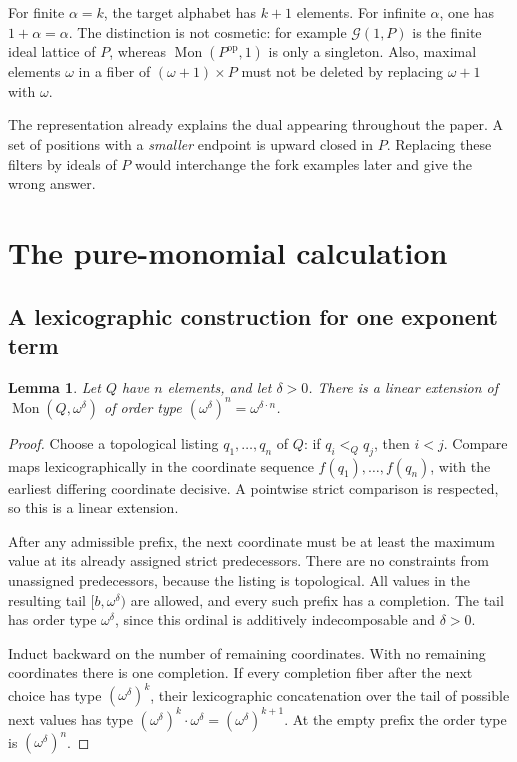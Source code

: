 \documentclass[11pt,a4paper]{article}
\newtheorem{lemma}[lemma]{Lemma}
\theoremstyle{definition}
\theoremstyle{remark}
\newcommand{\Mon}{\operatorname{Mon}}
\newcommand{\Grid}{\mathcal{G}}
\newcommand{\op}{\mathrm{op}}
\begin{document}
For finite $\alpha=k$, the target alphabet has $k+1$ elements. For infinite
$\alpha$, one has $1+\alpha=\alpha$. The distinction is not cosmetic:
for example $\Grid(1,P)$ is the finite ideal lattice of $P$, whereas
$\Mon(P^{\op},1)$ is only a singleton. Also, maximal elements $\omega$
in a fiber of $(\omega+1)\times P$ must not be deleted by replacing
$\omega+1$ with $\omega$.

The representation already explains the dual appearing throughout the
paper. A set of positions with a \emph{smaller} endpoint is upward closed
in $P$. Replacing these filters by ideals of $P$ would interchange the
fork examples later and give the wrong answer.

\section{The pure-monomial calculation}

\subsection{A lexicographic construction for one exponent term}
\begin{lemma}\label{lem:lex}
Let $Q$ have $n$ elements, and let $\delta>0$. There is a linear extension
of $\Mon(Q,\omega^\delta)$ of order type
$(\omega^\delta)^n=\omega^{\delta\cdot n}$.
\end{lemma}
\begin{proof}
Choose a topological listing $q_1,\ldots,q_n$ of $Q$: if $q_i<_Qq_j$,
then $i<j$. Compare maps lexicographically in the coordinate sequence
$f(q_1),\ldots,f(q_n)$, with the earliest differing coordinate decisive.
A pointwise strict comparison is respected, so this is a linear extension.

After any admissible prefix, the next coordinate must be at least the
maximum value at its already assigned strict predecessors. There are no
constraints from unassigned predecessors, because the listing is
topological. All values in the resulting tail $[b,\omega^\delta)$ are
allowed, and every such prefix has a completion. The tail has order type
$\omega^\delta$, since this ordinal is additively indecomposable and
$\delta>0$.

Induct backward on the number of remaining coordinates. With no remaining
coordinates there is one completion. If every completion fiber after the
next choice has type $(\omega^\delta)^k$, their lexicographic concatenation
over the tail of possible next values has type
$(\omega^\delta)^k\cdot\omega^\delta=(\omega^\delta)^{k+1}$.
At the empty prefix the order type is $(\omega^\delta)^n$.
\end{proof}
\end{document}

